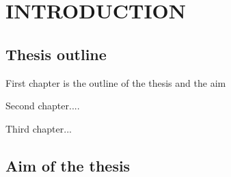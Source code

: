 \chapter{INTRODUCTION}
















\section{Thesis outline}
First chapter is the outline of the thesis and the aim

Second chapter....

Third chapter...


\section{Aim of the thesis}













